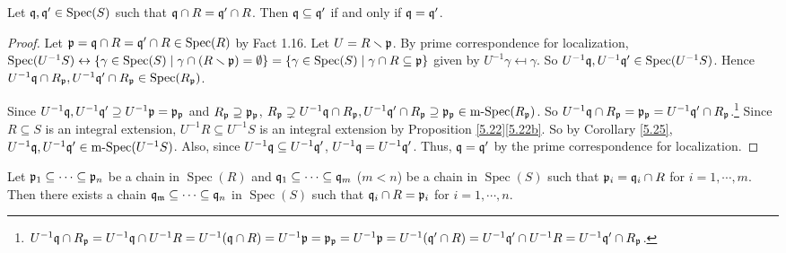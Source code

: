 \begin{proposition}\label{5.27}
    Let $\mathfrak{q},\mathfrak{q}' \in \operatorname{Spec}(S)$ such that $\mathfrak{q} \cap R = \mathfrak{q}' \cap R$. Then $\mathfrak{q} \subseteq \mathfrak{q}'$ if and only if $\mathfrak{q} = \mathfrak{q}'$.
\end{proposition}

\begin{proof}
    Let $\mathfrak{p} = \mathfrak{q} \cap R = \mathfrak{q}' \cap R \in \operatorname{Spec}(R)$ by Fact 1.16. Let $U = R \smallsetminus \mathfrak{p}$. By prime correspondence for localization, $\operatorname{Spec}(U^{-1}S) \leftrightarrow \{\gamma \in \operatorname{Spec}(S) \mid \gamma \cap (R\smallsetminus \mathfrak{p}) = \emptyset\} = \{\gamma \in \operatorname{Spec}(S) \mid \gamma \cap R \subseteq \mathfrak{p}\}$ given by $U^{-1}\gamma \mapsfrom \gamma$. So $U^{-1}\mathfrak{q},U^{-1}\mathfrak{q}' \in \operatorname{Spec}(U^{-1}S)$. Hence $U^{-1}\mathfrak{q} \cap R_{\mathfrak{p}}, U^{-1}\mathfrak{q}' \cap R_{\mathfrak{p}} \in \operatorname{Spec}(R_{\mathfrak{p}})$.
    \begin{center}
    \end{center}
    Since $U^{-1}\mathfrak{q}, U^{-1}\mathfrak{q}' \supseteq U^{-1}\mathfrak{p} = \mathfrak{p}_{\mathfrak{p}}$ and $R_{\mathfrak{p}} \supseteq \mathfrak{p}_{\mathfrak{p}}$, $R_{\mathfrak{p}} \supsetneq U^{-1}\mathfrak{q} \cap R_{\mathfrak{p}}, U^{-1}\mathfrak{q}' \cap R_{\mathfrak{p}} \supseteq \mathfrak{p}_{\mathfrak{p}} \in \operatorname{m-Spec}(R_{\mathfrak{p}})$. So $U^{-1}\mathfrak{q} \cap R_{\mathfrak{p}} = \mathfrak{p}_{\mathfrak{p}} = U^{-1}\mathfrak{q}' \cap R_{\mathfrak{p}}$.\footnote[2]{$U^{-1}\mathfrak{q} \cap R_{\mathfrak{p}} = U^{-1}\mathfrak{q} \cap U^{-1}R = U^{-1}(\mathfrak{q} \cap R) = U^{-1}\mathfrak{p} = \mathfrak{p}_{\mathfrak{p}} = U^{-1}\mathfrak{p} = U^{-1}(\mathfrak{q}' \cap R) = U^{-1}\mathfrak{q}' \cap U^{-1}R = U^{-1}\mathfrak{q}' \cap R_{\mathfrak{p}}$.} Since $R \subseteq S$ is an integral extension, $U^{-1}R \subseteq U^{-1}S$ is an integral extension by Proposition \ref{5.22}\ref{5.22b}. So by Corollary \ref{5.25}, $U^{-1}\mathfrak{q},U^{-1}\mathfrak{q}' \in \operatorname{m-Spec}(U^{-1}S)$. Also, since $U^{-1}\mathfrak{q} \subseteq U^{-1}\mathfrak{q}'$, $U^{-1}\mathfrak{q} = U^{-1}\mathfrak{q}'$. Thus, $\mathfrak{q} = \mathfrak{q}'$ by the prime correspondence for localization.
\end{proof}

\begin{theorem} \label{5.28}
    Let $\mathfrak{p}_1 \subseteq \cdots \subseteq \mathfrak{p}_n$ be a chain in $\operatorname{Spec}(R)$ and $\mathfrak{q}_1 \subseteq \cdots \subseteq \mathfrak{q}_m$ ($m < n$) be a chain in $\operatorname{Spec}(S)$ such that $\mathfrak{p}_i = \mathfrak{q}_i \cap R$ for $i = 1,\cdots,m$. Then there exists a chain $\mathfrak{q}_{\mathfrak{m}} \subseteq \cdots \subseteq \mathfrak{q}_n$ in $\operatorname{Spec}(S)$ such that $\mathfrak{q}_i \cap R = \mathfrak{p}_i$ for $i = 1,\cdots,n$.
\end{theorem}

